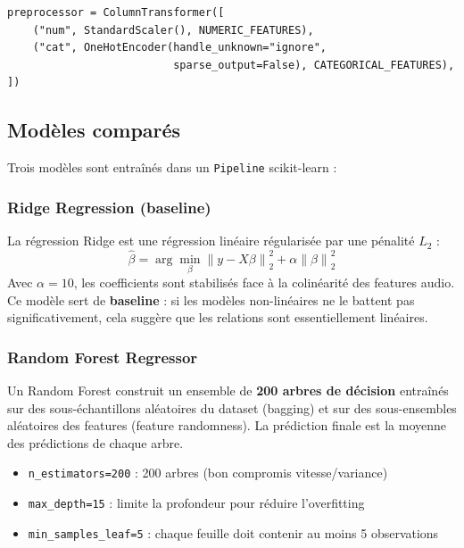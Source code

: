 \documentclass[12pt, a4paper]{article}
\begin{document}
\begin{codebox}
\begin{lstlisting}
preprocessor = ColumnTransformer([
    ("num", StandardScaler(), NUMERIC_FEATURES),
    ("cat", OneHotEncoder(handle_unknown="ignore",
                          sparse_output=False), CATEGORICAL_FEATURES),
])
\end{lstlisting}
\end{codebox}

\subsection{Modèles comparés}

Trois modèles sont entraînés dans un \texttt{Pipeline} scikit-learn :

\subsubsection{Ridge Regression (baseline)}

La régression Ridge est une régression linéaire régularisée par une pénalité $L_2$ :
\[
  \hat{\beta} = \arg\min_\beta \left\| y - X\beta \right\|_2^2 + \alpha \left\| \beta \right\|_2^2
\]
Avec $\alpha = 10$, les coefficients sont stabilisés face à la colinéarité des features
audio. Ce modèle sert de \textbf{baseline} : si les modèles non-linéaires ne le battent
pas significativement, cela suggère que les relations sont essentiellement linéaires.

\subsubsection{Random Forest Regressor}

Un Random Forest construit un ensemble de \textbf{200 arbres de décision} entraînés sur
des sous-échantillons aléatoires du dataset (bagging) et sur des sous-ensembles aléatoires
des features (feature randomness). La prédiction finale est la moyenne des prédictions
de chaque arbre.

\begin{itemize}[leftmargin=1.5cm]
  \item \texttt{n\_estimators=200} : 200 arbres (bon compromis vitesse/variance)
  \item \texttt{max\_depth=15} : limite la profondeur pour réduire l'overfitting
  \item \texttt{min\_samples\_leaf=5} : chaque feuille doit contenir au moins 5
        observations
\end{itemize}
\end{document}
